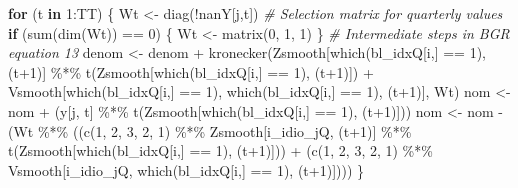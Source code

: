 \documentclass[
]{article}
\newenvironment{Shaded}{\begin{snugshade}}{\end{snugshade}}
\newcommand{\CommentTok}[1]{\textcolor[rgb]{0.56,0.35,0.01}{\textit{#1}}}
\newcommand{\ControlFlowTok}[1]{\textcolor[rgb]{0.13,0.29,0.53}{\textbf{#1}}}
\newcommand{\DecValTok}[1]{\textcolor[rgb]{0.00,0.00,0.81}{#1}}
\newcommand{\FunctionTok}[1]{\textcolor[rgb]{0.00,0.00,0.00}{#1}}
\newcommand{\NormalTok}[1]{#1}
\newcommand{\OtherTok}[1]{\textcolor[rgb]{0.56,0.35,0.01}{#1}}
\newcommand{\SpecialCharTok}[1]{\textcolor[rgb]{0.00,0.00,0.00}{#1}}
\begin{document}
\begin{Shaded}
\begin{Highlighting}[]
      \ControlFlowTok{for}\NormalTok{ (t }\ControlFlowTok{in} \DecValTok{1}\SpecialCharTok{:}\NormalTok{TT) \{}
\NormalTok{        Wt }\OtherTok{\textless{}{-}} \FunctionTok{diag}\NormalTok{(}\SpecialCharTok{!}\NormalTok{nanY[j,t]) }\CommentTok{\# Selection matrix for quarterly values}
        \ControlFlowTok{if}\NormalTok{ (}\FunctionTok{sum}\NormalTok{(}\FunctionTok{dim}\NormalTok{(Wt)) }\SpecialCharTok{==} \DecValTok{0}\NormalTok{) \{}
\NormalTok{          Wt }\OtherTok{\textless{}{-}} \FunctionTok{matrix}\NormalTok{(}\DecValTok{0}\NormalTok{, }\DecValTok{1}\NormalTok{, }\DecValTok{1}\NormalTok{)}
\NormalTok{        \}}
        \CommentTok{\# Intermediate steps in BGR equation 13}
\NormalTok{        denom }\OtherTok{\textless{}{-}}\NormalTok{ denom }\SpecialCharTok{+} 
          \FunctionTok{kronecker}\NormalTok{(Zsmooth[}\FunctionTok{which}\NormalTok{(bl\_idxQ[i,] }\SpecialCharTok{==} \DecValTok{1}\NormalTok{), (t}\SpecialCharTok{+}\DecValTok{1}\NormalTok{)] }\SpecialCharTok{\%*\%} \FunctionTok{t}\NormalTok{(Zsmooth[}\FunctionTok{which}\NormalTok{(bl\_idxQ[i,] }\SpecialCharTok{==} \DecValTok{1}\NormalTok{), (t}\SpecialCharTok{+}\DecValTok{1}\NormalTok{)]) }\SpecialCharTok{+} 
\NormalTok{                      Vsmooth[}\FunctionTok{which}\NormalTok{(bl\_idxQ[i,] }\SpecialCharTok{==} \DecValTok{1}\NormalTok{), }\FunctionTok{which}\NormalTok{(bl\_idxQ[i,] }\SpecialCharTok{==} \DecValTok{1}\NormalTok{), (t}\SpecialCharTok{+}\DecValTok{1}\NormalTok{)], Wt)}
\NormalTok{        nom }\OtherTok{\textless{}{-}}\NormalTok{ nom }\SpecialCharTok{+} 
\NormalTok{          (y[j, t] }\SpecialCharTok{\%*\%} \FunctionTok{t}\NormalTok{(Zsmooth[}\FunctionTok{which}\NormalTok{(bl\_idxQ[i,] }\SpecialCharTok{==} \DecValTok{1}\NormalTok{), (t}\SpecialCharTok{+}\DecValTok{1}\NormalTok{)]))}
\NormalTok{        nom }\OtherTok{\textless{}{-}}\NormalTok{ nom }\SpecialCharTok{{-}} 
\NormalTok{          (Wt }\SpecialCharTok{\%*\%}\NormalTok{ ((}\FunctionTok{c}\NormalTok{(}\DecValTok{1}\NormalTok{, }\DecValTok{2}\NormalTok{, }\DecValTok{3}\NormalTok{, }\DecValTok{2}\NormalTok{, }\DecValTok{1}\NormalTok{) }\SpecialCharTok{\%*\%}\NormalTok{ Zsmooth[i\_idio\_jQ, (t}\SpecialCharTok{+}\DecValTok{1}\NormalTok{)] }\SpecialCharTok{\%*\%} \FunctionTok{t}\NormalTok{(Zsmooth[}\FunctionTok{which}\NormalTok{(bl\_idxQ[i,] }\SpecialCharTok{==} \DecValTok{1}\NormalTok{), (t}\SpecialCharTok{+}\DecValTok{1}\NormalTok{)])) }\SpecialCharTok{+} 
\NormalTok{                     (}\FunctionTok{c}\NormalTok{(}\DecValTok{1}\NormalTok{, }\DecValTok{2}\NormalTok{, }\DecValTok{3}\NormalTok{, }\DecValTok{2}\NormalTok{, }\DecValTok{1}\NormalTok{) }\SpecialCharTok{\%*\%}\NormalTok{ Vsmooth[i\_idio\_jQ, }\FunctionTok{which}\NormalTok{(bl\_idxQ[i,] }\SpecialCharTok{==} \DecValTok{1}\NormalTok{), (t}\SpecialCharTok{+}\DecValTok{1}\NormalTok{)])))}
\NormalTok{      \}}
      

\end{Highlighting}
\end{Shaded}
\end{document}
